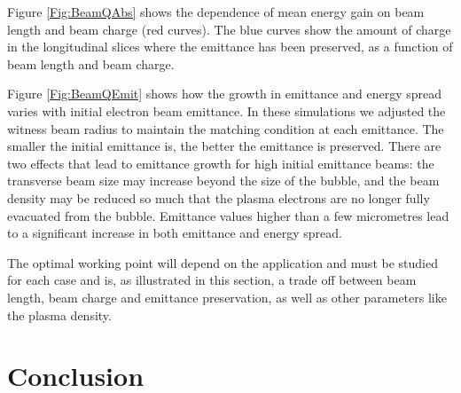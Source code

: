 \documentclass[aps,prstab,reprint,amsmath,amssymb,groupedaddress]{revtex4-1}
\begin{document}
Figure \ref{Fig:BeamQAbs} shows the dependence of mean energy gain on beam length and beam charge (red curves). The blue
curves show the amount of charge in the longitudinal slices where the emittance has been preserved, as a function of
beam length and beam charge.

Figure \ref{Fig:BeamQEmit} shows how the growth in emittance and energy spread varies with initial electron beam
emittance. In these simulations we adjusted the witness beam radius to maintain the matching condition at each
emittance. The smaller the initial emittance is, the better the emittance is preserved. There are two effects that lead
to emittance growth for high initial emittance beams: the transverse beam size may increase beyond the size of the
bubble, and the beam density may be reduced so much that the plasma electrons are no longer fully evacuated from the
bubble. Emittance values higher than a few micrometres lead to a significant increase in both emittance and energy
spread. 

The optimal working point will depend on the application and must be studied for each case and is, as illustrated in
this section, a trade off between beam length, beam charge and emittance preservation, as well as other parameters
like the plasma density.   

\section{Conclusion}\label{S:C}

\end{document}
